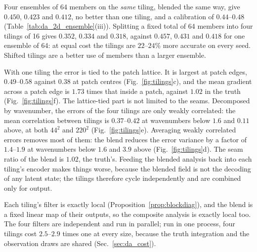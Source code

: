  Four ensembles of 64 members on
the \emph{same} tiling, blended the same way, give $0.450$, $0.423$ and $0.412$,
no better than one tiling, and a calibration of $0.44$--$0.48$
(Table~\ref{tab:da_2d_ensemble}(iii)). Splitting a fixed total of 64
members into four tilings of 16 gives $0.352$, $0.334$ and $0.318$, against
$0.457$, $0.431$ and $0.418$ for one ensemble of 64: at equal cost the tilings
are $22$--$24\%$ more accurate on every seed. Shifted tilings are a better use
of members than a larger ensemble.

 With one tiling the error is tied to the patch
lattice. It is largest at patch edges, $0.49$--$0.58$ against $0.38$ at patch
centres (Fig.~\ref{fig:tilings}c), and the mean gradient across a patch
edge is $1.73$ times that inside a patch, against $1.02$ in the truth
(Fig.~\ref{fig:tilings}f). The lattice-tied part is not limited to
the seams. Decomposed by wavenumber, the errors of the four tilings are
only weakly correlated: the mean correlation between tilings is $0.37$--$0.42$
at wavenumbers below $1.6$ and $0.11$ above, at both $44^2$ and $220^2$
(Fig.~\ref{fig:tilings}e). Averaging weakly correlated errors removes most
of them: the blend reduces the error variance by a factor of $1.4$--$1.9$ at
wavenumbers below $1.6$ and $3.9$ above (Fig.~\ref{fig:tilings}d). The seam
ratio of the blend is $1.02$, the truth's. Feeding the blended analysis
back into each tiling's encoder makes things worse, because the blended
field is not the decoding of any latent state; the tilings therefore
cycle independently and are combined only for output.

 Each tiling's filter is exactly local
(Proposition~\ref{prop:blockdiag}), and the blend is a fixed linear map
of their outputs, so the composite analysis is exactly local too. The
four filters are independent and run in parallel; run in one process,
four tilings cost $2.5$--$2.9$ times one at every size, because the truth
integration and the observation draws are shared (Sec.~\ref{sec:da_cost}).

